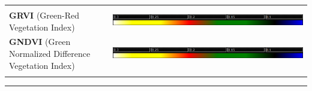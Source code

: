 \documentclass{article}
\begin{document}
{\begin{landscape}
\begin{tabularx}{\linewidth}{>{\arraybackslash}X>{\arraybackslash}X}
\begin{minipage}[t]{\linewidth}
                                                                                                  \end{minipage}\\
                    \vspace*{3\baselineskip}
                    \textbf{GRVI} (Green-Red Vegetation Index) &\vspace*{2\baselineskip} \begin{minipage}[t]{\linewidth}
                                                                                                     \vspace{0pt}
                                                                                                     \includegraphics[width=\linewidth]{Figures/2.png}
                                                                                                  \end{minipage}
                                                \\
                    \vspace*{3\baselineskip}
                    \textbf{GNDVI} (Green Normalized Difference Vegetation Index) & \vspace*{2\baselineskip} \begin{minipage}[t]{\linewidth}
                                                                                                                   \vspace{0pt}
                                                                                                                   \includegraphics[width=\linewidth]{Figures/2.png}
                                                                                                                \end{minipage}\\   
                    \addlinespace[55] 
                    \end{tabularx}
                    \newpage
                   \vspace*{-3.8\baselineskip}
                    \hrule
                    \vspace*{3\baselineskip}
                    

\end{landscape}}
\end{document}

